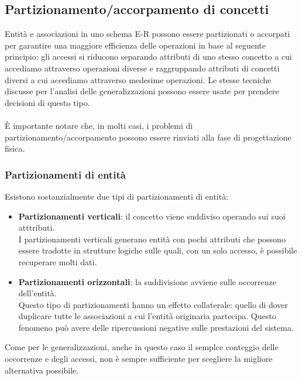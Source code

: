 \subsection{Partizionamento/accorpamento di concetti}
Entità e associazioni in uno schema E-R possono essere partizionati o accorpati per garantire una maggiore efficienza delle operazioni in base al seguente principio: gli accessi si riducono separando attributi di uno stesso concetto a cui accediamo attraverso operazioni diverse e raggruppando attributi di concetti diversi a cui accediamo attraverso medesime operazioni. Le stesse tecniche discusse per l'analisi delle generalizzazioni possono essere usate per prendere decisioni di questo tipo.\\\\
È importante notare che, in molti casi, i problemi di partizionamento/accorpamento possono essere rinviati alla fase di progettazione fisica.
\subsubsection{Partizionamenti di entità}
Esistono sostanzialmente due tipi di partizionamenti di entità:
    \begin{itemize}
        \item{\textbf{Partizionamenti verticali}: il concetto viene suddiviso operando sui suoi atttributi.\\
        I partizionamenti verticali generano entità con pochi attributi che possono essere tradotte in strutture logiche sulle quali, con un solo accesso, è possibile recuperare molti dati.}
        \item{\textbf{Partizionamenti orizzontali}: la suddivisione avviene sulle occorrenze dell'entità.\\
        Questo tipo di partizionamenti hanno un effetto collaterale: quello di dover duplicare tutte le associazioni a cui l'entità originaria partecipa. Questo fenomeno può avere delle ripercussioni negative sulle prestazioni del sistema.}
    \end{itemize}
Come per le generalizzazioni, anche in questo caso il semplce conteggio delle occorrenze e degli accessi, non è sempre sufficiente per scegliere la migliore alternativa possibile.

